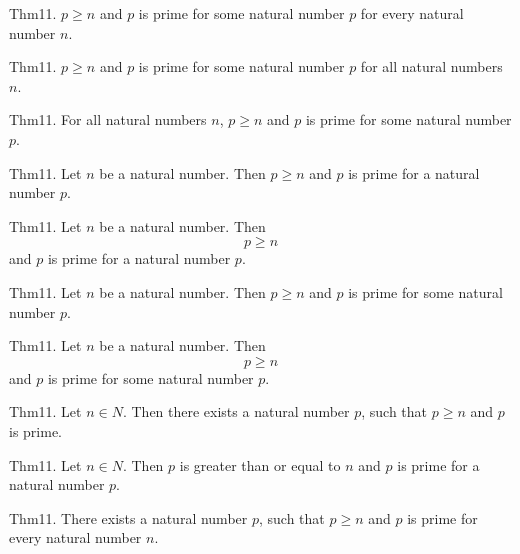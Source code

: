 \documentclass{article}
\begin{document}
Thm11. $p \geq n$ and $p$ is prime for some natural number $p$ for every natural number $n$.

Thm11. $p \geq n$ and $p$ is prime for some natural number $p$ for all natural numbers $n$.

Thm11. For all natural numbers $n$, $p \geq n$ and $p$ is prime for some natural number $p$.

Thm11. Let $n$ be a natural number. Then $p \geq n$ and $p$ is prime for a natural number $p$.

Thm11. Let $n$ be a natural number. Then $$p \geq n$$ and $p$ is prime for a natural number $p$.

Thm11. Let $n$ be a natural number. Then $p \geq n$ and $p$ is prime for some natural number $p$.

Thm11. Let $n$ be a natural number. Then $$p \geq n$$ and $p$ is prime for some natural number $p$.

Thm11. Let $n \in N$. Then there exists a natural number $p$, such that $p \geq n$ and $p$ is prime.

Thm11. Let $n \in N$. Then $p$ is greater than or equal to $n$ and $p$ is prime for a natural number $p$.

Thm11. There exists a natural number $p$, such that $p \geq n$ and $p$ is prime for every natural number $n$.
\end{document}
